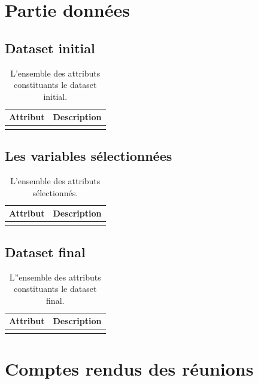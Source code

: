 \chapter{Partie données}

\section*{Dataset initial}
\begin{xltabular}{17cm}{|X|X|}
    \hline
    Attribut & Description     \\\hline
    
    \caption{L'ensemble des attributs constituants le dataset initial.}
    \label{app:initial-dataset}
\end{xltabular}
\FloatBarrier

\section*{Les variables sélectionnées}
\begin{xltabular}{17cm}{|X|X|}
    \hline
    Attribut & Description     \\\hline

    \caption{L'ensemble des attributs sélectionnés.}
    \label{app:selected-dataset}
\end{xltabular}
\FloatBarrier

\section*{Dataset final}
\begin{xltabular}{17cm}{|X|X|}
    \hline
    Attribut & Description     \\\hline

    \caption{L''ensemble des attributs constituants le dataset final.}
    \label{app:final-dataset}
\end{xltabular}
\FloatBarrier

\chapter{Comptes rendus des réunions}



